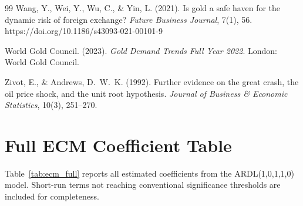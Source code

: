 \documentclass[12pt,a4paper]{article}
\begin{document}
\begin{thebibliography}{99}
Wang, Y., Wei, Y., Wu, C., \& Yin, L. (2021).
Is gold a safe haven for the dynamic risk of foreign exchange?
\textit{Future Business Journal}, 7(1), 56.
https://doi.org/10.1186/s43093-021-00101-9

World Gold Council. (2023).
\textit{Gold Demand Trends Full Year 2022}.
London: World Gold Council.

Zivot, E., \& Andrews, D.~W.~K. (1992).
Further evidence on the great crash, the oil price shock, and the unit root hypothesis.
\textit{Journal of Business \& Economic Statistics}, 10(3), 251--270.

\end{thebibliography}

\newpage
\appendix

\section{Full ECM Coefficient Table}
\label{app:ecm}

Table~\ref{tab:ecm_full} reports all estimated coefficients from the
ARDL(1,0,1,1,0) model. Short-run terms not reaching conventional significance
thresholds are included for completeness.
\end{document}
